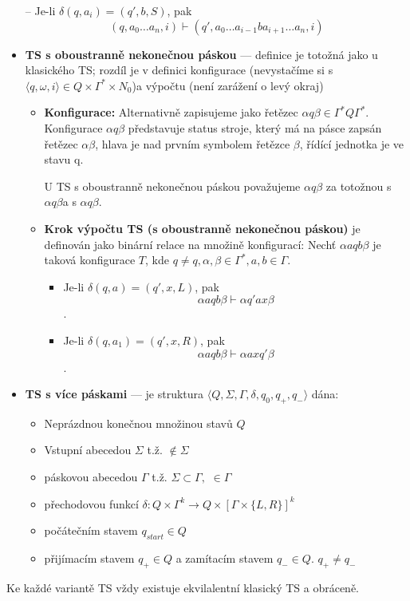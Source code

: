 \documentclass[10pt,a4paper]{article}
\theoremstyle{note}
\begin{document}
\begin{itemize}
				-- Je-li $\delta(q, a_{i}) = (q', b, S)$, pak
					$$(q,a_{0} \dots a_{n}, i) \vdash (q', a_{0} \dots a_{i-1}ba_{i+1} \dots a_{n},i) $$
			\item \textbf{TS s oboustranně nekonečnou páskou} --- definice je totožná jako u klasického TS; rozdíl je v definici
			 konfigurace (nevystačíme si s $\langle q, \omega, i \rangle \in Q \times \Gamma^{*} \times N_{0}$)a výpočtu
			(není zarážení o levý okraj)
				\begin{itemize}
					\item \textbf{Konfigurace:} Alternativně zapisujeme jako řetězec
					 	$\alpha q\beta \in \Gamma^{*}Q\Gamma^{*}.$
						Konfigurace $\alpha q\beta$ představuje status stroje, který má na pásce zapsán řetězec
						$ \alpha\beta$,
						hlava	je nad prvním symbolem řetězce $\beta$, řídící jednotka je ve stavu q.

						U TS s oboustranně nekonečnou páskou považujeme $\alpha q\beta$ za totožnou s
						$\alpha q\beta$\textvisiblespace a s \textvisiblespace$\alpha q\beta$.
					\item \textbf{Krok výpočtu TS (s oboustranně nekonečnou páskou)} je definován jako binární
						relace na množině konfigurací: Nechť $\alpha aqb\beta$ je taková konfigurace $T$, kde
						$q \neq q, \alpha, \beta \in \Gamma^{*}, a,b \in \Gamma.$
						\begin{itemize}
							\item Je-li $\delta(q,a) = (q', x, L) $, pak  $$\alpha aqb\beta \vdash \alpha q'ax\beta$$.
							\item Je-li $\delta(q,a_{1}) = (q', x, R) $, pak
									$$\alpha aqb\beta \vdash \alpha axq'\beta$$.
						\end{itemize}
				\end{itemize}
					\item \textbf{TS s více páskami} --- je struktura $\langle Q, \Sigma, \Gamma, \delta, q_{0}, q_{+},
						q_{-} \rangle $ dána:
						\begin{itemize}
							\item Neprázdnou konečnou množinou stavů $Q$
							\item Vstupní abecedou  $\Sigma$ t.ž. \textvisiblespace $ \notin \Sigma$
							\item páskovou abecedou $\Gamma$ t.ž. $\Sigma \subset \Gamma,$ \textvisiblespace
								$\in  \Gamma $
							\item přechodovou funkcí $\delta : Q \times  \Gamma^{k} \rightarrow Q \times [ \Gamma
								\times \{L, R \} ]^{k}$
							\item počátečním stavem $q_{start} \in Q$
							\item přijímacím stavem $q_{+} \in Q $ a zamítacím stavem $q_{-}
								\in Q.$ $q_{+} \neq q_{-}$
						\end{itemize}

		\end{itemize}
		Ke každé variantě TS vždy existuje ekvilalentní klasický TS a obráceně.
\end{document}
